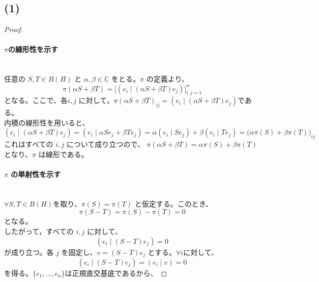\documentclass[dvipdfmx,a4paper]{jsarticle}
\theoremstyle{mystyle}
\begin{document}
\vspace{1em}

\section*{}
\subsection*{\textbf{(1)}}
\begin{proof}
\ \\
\paragraph{\textbf{$\pi$の線形性}を示す}\ \\
\noindent
任意の $S, T \in B(H)$ と $\alpha, \beta \in \mathbb{C}$ をとる。$\pi$ の定義より、
$$
  \pi(\alpha S + \beta T) = \bigl[(e_i \mid (\alpha S + \beta T)e_j)\bigr]_{i,j=1}^{n}
$$
となる。ここで、各$i, j$ に対して，$\pi(\alpha S + \beta T)_{ij} = (e_i \mid (\alpha S + \beta T)e_j)$である。\\
\noindent
内積の線形性を用いると、
\[
    (e_i \mid (\alpha S + \beta T)e_j)
  = (e_i \mid \alpha S e_j + \beta T e_j)
  = \alpha (e_i \mid S e_j) + \beta (e_i \mid T e_j)
  = \bigl(\alpha \pi(S) + \beta \pi(T)\bigr)_{ij}
\]
これはすべての $i, j$ について成り立つので、
$\pi(\alpha S + \beta T) = \alpha \pi(S) + \beta \pi(T)$となり、$\pi$ は線形である。

\vspace{0.8em}
\noindent
\paragraph{\textbf{$\pi$ の単射性}を示す}\ \\
\noindent
$\forall S, T \in B(H)$を取り、$\pi(S)=\pi(T)$ と仮定する。このとき、
\[
  \pi(S-T)=\pi(S)-\pi(T)=0
\]
となる。\\
\noindent
したがって，すべての $i,j$ に対して、
\[
  (e_i\mid (S-T)e_j)=0
\]
が成り立つ。各 $j$ を固定し、$v = (S-T)e_j$ とする。$\forall i$に対して、
\[
  (e_i\mid (S-T)e_j) = (e_i\mid v) = 0
\]
を得る。$\{e_1,\dots,e_n\}$は正規直交基底であるから、


\end{proof}
\end{document}
